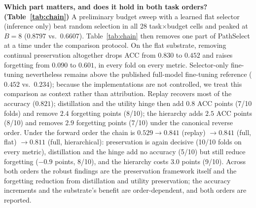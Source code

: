 \documentclass{article}
\begin{document}
\textbf{Which part matters, and does it hold in both task orders? (Table~\ref{tab:chain})}
A preliminary budget sweep with a learned flat selector (inference only) beat random selection in all 28 task$\times$budget cells and peaked at $B=8$ ($0.8797$ vs.\ $0.6607$). Table~\ref{tab:chain} then removes one part of PathSelect at a time under the comparison protocol. On the flat substrate, removing continual preservation altogether drops ACC from $0.830$ to $0.452$ and raises forgetting from $0.090$ to $0.601$, in every fold on every metric. Selector-only fine-tuning nevertheless remains above the published full-model fine-tuning reference ($0.452$ vs.\ $0.234$); because the implementations are not controlled, we treat this comparison as context rather than attribution. Replay recovers most of the accuracy ($0.821$); distillation and the utility hinge then add $0.8$ ACC points (7/10 folds) and remove $2.4$ forgetting points (8/10); the hierarchy adds $2.5$ ACC points (8/10) and removes $2.9$ forgetting points (7/10) under the canonical reverse order. Under the forward order the chain is $0.529\rightarrow0.841$ (replay) $\rightarrow0.841$ (full, flat) $\rightarrow0.811$ (full, hierarchical): preservation is again decisive (10/10 folds on every metric), distillation and the hinge add no accuracy (5/10) but still reduce forgetting ($-0.9$ points, 8/10), and the hierarchy costs $3.0$ points (9/10). Across both orders the robust findings are the preservation framework itself and the forgetting reduction from distillation and utility preservation; the accuracy increments and the substrate's benefit are order-dependent, and both orders are reported.
\end{document}
